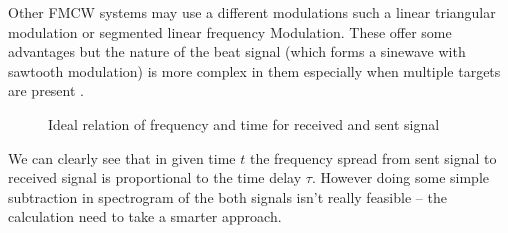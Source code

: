 Other FMCW systems may use a different modulations such a linear triangular modulation or segmented linear frequency Modulation.
These offer some advantages but the nature  of the beat signal (which forms a sinewave with sawtooth modulation) is more complex in them especially when multiple targets are present \cite{jankiraman2018}.

\begin{figure}[h!]
	\centering
{}

	\caption[Ideal relation of frequency and time for received and sent signal]{Ideal relation of frequency and time for received and sent signal}
	\label{fig:fmcw_ideal}
\end{figure}

We can clearly see that in given time $t$ the frequency spread from sent signal to received signal is proportional to the time delay $\tau$.
However doing some simple subtraction in spectrogram of the both signals isn't really feasible -- the calculation need to take a smarter approach.


